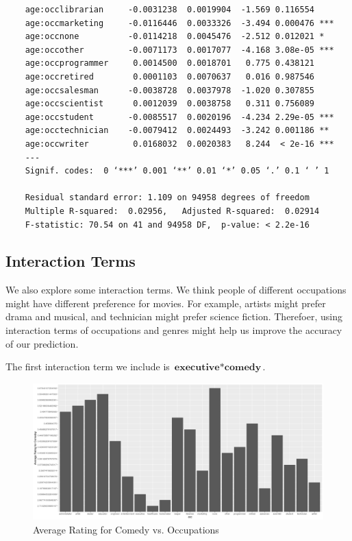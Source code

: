 \documentclass[11pt]{article}
\begin{document}
\begin{verbatim}
    age:occlibrarian     -0.0031238  0.0019904  -1.569 0.116554    
    age:occmarketing     -0.0116446  0.0033326  -3.494 0.000476 ***
    age:occnone          -0.0114218  0.0045476  -2.512 0.012021 *  
    age:occother         -0.0071173  0.0017077  -4.168 3.08e-05 ***
    age:occprogrammer     0.0014500  0.0018701   0.775 0.438121    
    age:occretired        0.0001103  0.0070637   0.016 0.987546    
    age:occsalesman      -0.0038728  0.0037978  -1.020 0.307855    
    age:occscientist      0.0012039  0.0038758   0.311 0.756089    
    age:occstudent       -0.0085517  0.0020196  -4.234 2.29e-05 ***
    age:occtechnician    -0.0079412  0.0024493  -3.242 0.001186 ** 
    age:occwriter         0.0168032  0.0020383   8.244  < 2e-16 ***
    ---
    Signif. codes:  0 ‘***’ 0.001 ‘**’ 0.01 ‘*’ 0.05 ‘.’ 0.1 ‘ ’ 1
    
    Residual standard error: 1.109 on 94958 degrees of freedom
    Multiple R-squared:  0.02956,   Adjusted R-squared:  0.02914 
    F-statistic: 70.54 on 41 and 94958 DF,  p-value: < 2.2e-16
\end{verbatim}

\subsection{Interaction Terms}
We also explore some interaction terms. We think people of 
different occupations might have different preference for movies.
For example, artists might prefer drama and musical, and technician
might prefer science fiction. Therefoer, using interaction terms 
of occupations and genres might help us improve the accuracy of 
our prediction.

The first interaction term we include is $\textbf{executive} * \textbf{comedy}$.
\begin{figure}[ht!]
\begin{center}
\includegraphics[width=\textwidth]{comedy_occ.png}
\caption{Average Rating for Comedy vs. Occupations}
\end{center}
\end{figure}
\end{document}

